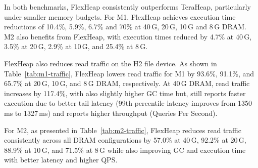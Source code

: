In both benchmarks, FlexHeap consistently outperforms TeraHeap, particularly under smaller memory budgets.  
For M1, FlexHeap achieves execution time reductions of 10.4\%, 5.9\%, 6.7\% and 70\% at 40\,G, 20\,G, 10\,G and 8\,G DRAM.
M2 also benefits from FlexHeap, with execution times reduced 
by 4.7\% at 40\,G, 3.5\% at 20\,G, 2.9\% at 10\,G, and 25.4\% at 8\,G. 

FlexHeap also reduces read traffic on the H2 file device.
As shown in Table~\ref{tab:m1-traffic}, FlexHeap lowers read traffic for M1 by 93.6\%, 
91.1\%, and 65.7\% at 20\,G, 10\,G, and 8\,G DRAM, respectively. At 40\,G DRAM, read traffic increases 
by 117.4\%, with also slightly higher GC time but, still reports faster execution due to better tail 
latency (99th percentile latency improves from 1350\,ms to 1327\,ms) and reports higher throughput (Queries Per Second).

For M2, as presented in Table~\ref{tab:m2-traffic}, FlexHeap reduces read traffic consistently across all DRAM configurations by 57.0\% at 40\,G, 
92.2\% at 20\,G, 88.9\% at 10\,G, and 71.5\% at 8\,G while also improving GC and execution time with better latency and higher QPS. 



